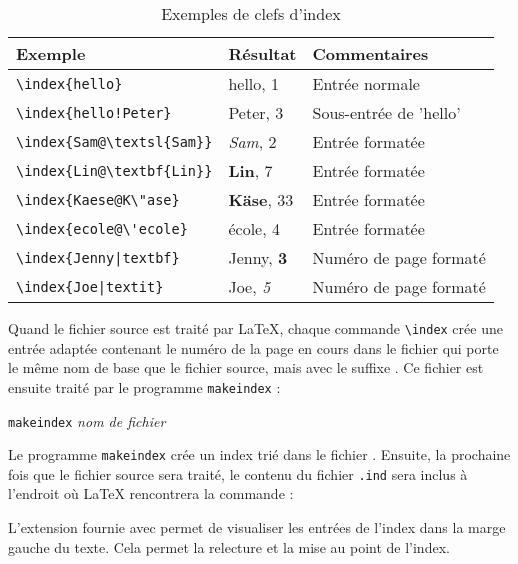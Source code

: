 \begin{table}[!htp]
\caption{Exemples de clefs d'index}
\label{index}
\begin{center}
\begin{tabular}{@{}lll@{}}
  \textbf{Exemple} &\textbf{Résultat} &\textbf{Commentaires}\\\hline
  \rule{0pt}{1.05em}\verb|\index{hello}| &hello, 1 &Entrée normale\\
\verb|\index{hello!Peter}|   &\hspace*{2ex}Peter, 3 &Sous-entrée de 'hello'\\
\verb|\index{Sam@\textsl{Sam}}|     &\textsl{Sam}, 2& Entrée formatée\\
\verb|\index{Lin@\textbf{Lin}}|     &\textbf{Lin}, 7& Entrée formatée\\
\verb|\index{Kaese@K\"ase}|     &\textbf{K\"ase}, 33& Entrée formatée\\
\verb.\index{ecole@\'ecole}.     &\'ecole, 4& Entrée formatée\\
\verb.\index{Jenny|textbf}.     &Jenny, \textbf{3}& Numéro de page formaté\\
\verb.\index{Joe|textit}.     &Joe, \textit{5}& Numéro de page formaté\\
\end{tabular}
\end{center}
\end{table}

Quand le fichier source est traité par \LaTeX{}, chaque commande
\verb|\index| crée une entrée adaptée contenant le numéro de la page
en cours dans le fichier qui porte le même nom de base que le fichier
source, mais avec le suffixe . Ce fichier est ensuite traité
par le programme \texttt{makeindex} :

\begin{lscommand}
  \texttt{makeindex} \emph{nom de fichier}
\end{lscommand}
Le programme \texttt{makeindex} crée un index trié dans le fichier
. Ensuite, la prochaine fois que  le fichier source sera
traité, le contenu du fichier \texttt{.ind} sera
inclus à l'endroit où \LaTeX{} rencontrera la commande :
\begin{lscommand}
\end{lscommand}

L'extension  fournie avec \LaTeXe{} permet de visualiser
les entrées de l'index dans la marge gauche du texte. Cela permet la
relecture et la mise au point de l'index.

